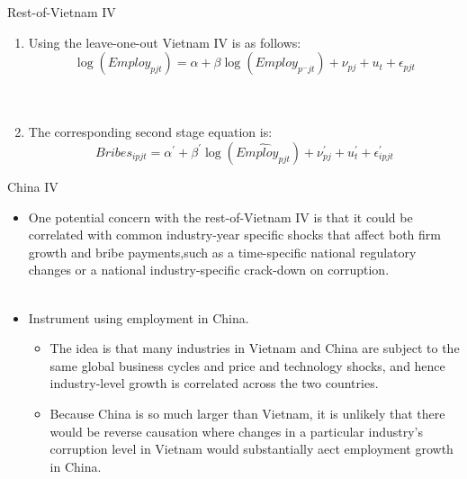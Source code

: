 \documentclass{beamer}
\begin{document}
\begin{frame}{Rest-of-Vietnam IV}

\begin{enumerate}
\item Using the leave-one-out Vietnam IV is as follows:
\begin{equation}
\log \left( Employ_{pjt} \right) =\alpha +\beta \log \left( Employ_{p^-jt} \right) +\nu _{pj}+u_t+\epsilon _{pjt} 
\end{equation} \\~

\item The corresponding second stage equation is: 
\begin{equation}
Bribes_{ipjt}=\alpha ^\prime+\beta ^\prime\log \left( \widehat{Employ_{pjt}} \right) +\nu_{pj}^{\prime}+u_{t}^{\prime}+\epsilon _{ipjt}^{\prime}   
\end{equation}

\end{enumerate}

\end{frame}	

\begin{frame}{China IV}

\begin{itemize}
\item One potential concern with the rest-of-Vietnam IV is that it could be correlated with common industry-year specific shocks that affect both firm growth and bribe payments,such as a time-specific national regulatory changes or a national industry-specific crack-down on corruption. \\~

\item Instrument using employment in China.
\begin{itemize}
\item The idea is that many industries in Vietnam and China are subject to the same global business cycles and price and technology shocks, and hence industry-level growth is correlated across the two countries.
\item Because China is so much larger than Vietnam, it is unlikely that there would be reverse causation where changes in a particular industry's corruption level in Vietnam would substantially aect employment growth in China.
\end{itemize}

\end{itemize}

\end{frame}	
\end{document}
